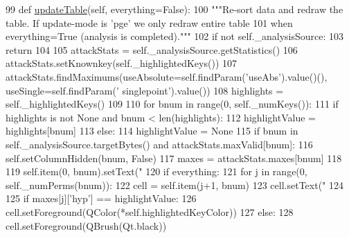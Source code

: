 \begin{DoxyCode}
99     \textcolor{keyword}{def }\hyperlink{classsoftware_1_1chipwhisperer_1_1common_1_1results_1_1table_1_1ResultsTable_a9ab46feba7b80d80888dae7342a4c7c9}{updateTable}(self, everything=False):
100         \textcolor{stringliteral}{"""Re-sort data and redraw the table. If update-mode is 'pge' we only redraw entire table}
101 \textcolor{stringliteral}{        when  everything=True (analysis is completed)."""}
102         \textcolor{keywordflow}{if} \textcolor{keywordflow}{not} self.\_analysisSource:
103             \textcolor{keywordflow}{return}
104 
105         attackStats = self.\_analysisSource.getStatistics()
106         attackStats.setKnownkey(self.\_highlightedKeys())
107         attackStats.findMaximums(useAbsolute=self.findParam(\textcolor{stringliteral}{'useAbs'}).value()(), useSingle=self.findParam(\textcolor{stringliteral}{'
      singlepoint'}).value())
108         highlights = self.\_highlightedKeys()
109 
110         \textcolor{keywordflow}{for} bnum \textcolor{keywordflow}{in} range(0, self.\_numKeys()):
111             \textcolor{keywordflow}{if} highlights \textcolor{keywordflow}{is} \textcolor{keywordflow}{not} \textcolor{keywordtype}{None} \textcolor{keywordflow}{and} bnum < len(highlights):
112                 highlightValue = highlights[bnum]
113             \textcolor{keywordflow}{else}:
114                 highlightValue = \textcolor{keywordtype}{None}
115             \textcolor{keywordflow}{if} bnum \textcolor{keywordflow}{in} self.\_analysisSource.targetBytes() \textcolor{keywordflow}{and} attackStats.maxValid[bnum]:
116                 self.setColumnHidden(bnum, \textcolor{keyword}{False})
117                 maxes = attackStats.maxes[bnum]
118 
119                 self.item(0, bnum).setText(\textcolor{stringliteral}{"%
120                 \textcolor{keywordflow}{if} everything:
121                     \textcolor{keywordflow}{for} j \textcolor{keywordflow}{in} range(0, self.\_numPerms(bnum)):
122                         cell = self.item(j+1, bnum)
123                         cell.setText(\textcolor{stringliteral}{"%
124 
125                         \textcolor{keywordflow}{if} maxes[j][\textcolor{stringliteral}{'hyp'}] == highlightValue:
126                             cell.setForeground(QColor(*self.highlightedKeyColor))
127                         \textcolor{keywordflow}{else}:
128                             cell.setForeground(QBrush(Qt.black))
}}
\end{DoxyCode}
